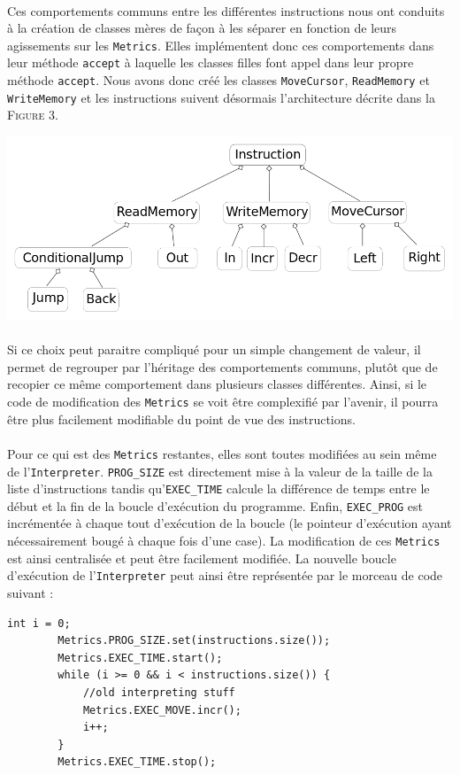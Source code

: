 \documentclass[a4paper]{article}
\begin{document}
\paragraph{}Ces comportements communs entre les différentes instructions nous ont conduits à la création de classes mères de façon à les séparer en fonction de leurs agissements sur les \texttt{Metrics}. Elles implémentent donc ces comportements dans leur méthode \texttt{accept} à laquelle les classes filles font appel dans leur propre méthode \texttt{accept}. Nous avons donc créé les classes \texttt{MoveCursor}, \texttt{ReadMemory} et \texttt{WriteMemory} et les instructions suivent désormais l'architecture décrite dans la \textsc{Figure 3}.
\begin{center}
	\includegraphics[scale=0.4]{schemametrics.png}
\end{center}
\paragraph{}Si ce choix peut paraitre compliqué pour un simple changement de valeur, il permet de regrouper par l'héritage des comportements communs, plutôt que de recopier ce même comportement dans plusieurs classes différentes. Ainsi, si le code de modification des \texttt{Metrics} se voit être complexifié par l'avenir, il pourra être plus facilement modifiable du point de vue des instructions.

\paragraph{}Pour ce qui est des \texttt{Metrics} restantes, elles sont toutes modifiées au sein même de l'\texttt{Interpreter}. \texttt{PROG\_SIZE} est directement mise à la valeur de la taille de la liste d'instructions tandis qu'\texttt{EXEC\_TIME} calcule la différence de temps entre le début et la fin de la boucle d'exécution du programme. Enfin, \texttt{EXEC\_PROG} est incrémentée à chaque tout d'exécution de la boucle (le pointeur d'exécution ayant nécessairement bougé à chaque fois d'une case). La modification de ces \texttt{Metrics} est ainsi centralisée et peut être facilement modifiée. La nouvelle boucle d'exécution de l'\texttt{Interpreter} peut ainsi être représentée par le morceau de code suivant :
\begin{verbatim}
int i = 0;
		Metrics.PROG_SIZE.set(instructions.size());
		Metrics.EXEC_TIME.start();
		while (i >= 0 && i < instructions.size()) {
		    //old interpreting stuff
		    Metrics.EXEC_MOVE.incr();
		    i++;
		}
		Metrics.EXEC_TIME.stop();
\end{verbatim}
\end{document}
